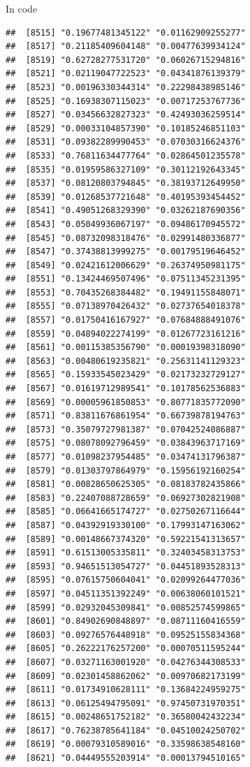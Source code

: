 \documentclass[ignorenonframetext,]{beamer}
\begin{document}
\begin{frame}[fragile]{In code}
\begin{verbatim}
##  [8515] "0.19677481345122" "0.01162909255277"
##  [8517] "0.21185409604148" "0.00477639934124"
##  [8519] "0.62728277531720" "0.06026715294816"
##  [8521] "0.02119047722523" "0.04341876139379"
##  [8523] "0.00196330344314" "0.22298438985146"
##  [8525] "0.16938307115023" "0.00717253767736"
##  [8527] "0.03456632827323" "0.42493036259514"
##  [8529] "0.00033104857390" "0.10185246851103"
##  [8531] "0.09382289990453" "0.07030316624376"
##  [8533] "0.76811634477764" "0.02864501235578"
##  [8535] "0.01959586327109" "0.30112192643345"
##  [8537] "0.08120803794845" "0.38193712649950"
##  [8539] "0.01268537721648" "0.40195393454452"
##  [8541] "0.49051268329390" "0.03262187690356"
##  [8543] "0.05049936067197" "0.09486170945572"
##  [8545] "0.08732098318476" "0.02991480336877"
##  [8547] "0.37438813999275" "0.00179519646452"
##  [8549] "0.02421612006629" "0.26374950981175"
##  [8551] "0.13424469507496" "0.07511345231395"
##  [8553] "0.70435268384482" "0.19491155848071"
##  [8555] "0.07138970426432" "0.02737654018378"
##  [8557] "0.01750416167927" "0.07684888491076"
##  [8559] "0.04894022274199" "0.01267723161216"
##  [8561] "0.00115385356790" "0.00019398318090"
##  [8563] "0.00480619235821" "0.25631141129323"
##  [8565] "0.15933545023429" "0.02173232729127"
##  [8567] "0.01619712989541" "0.10178562536883"
##  [8569] "0.00005961850853" "0.80771835772090"
##  [8571] "0.83811676861954" "0.66739878194763"
##  [8573] "0.35079727981387" "0.07042524086887"
##  [8575] "0.08078092796459" "0.03843963717169"
##  [8577] "0.01098237954485" "0.03474131796387"
##  [8579] "0.01303797864979" "0.15956192160254"
##  [8581] "0.00828650625305" "0.08183782435866"
##  [8583] "0.22407088728659" "0.06927302821908"
##  [8585] "0.06641665174727" "0.02750267116644"
##  [8587] "0.04392919330100" "0.17993147163062"
##  [8589] "0.00148667374320" "0.59221541313657"
##  [8591] "0.61513005335811" "0.32403458313753"
##  [8593] "0.94651513054727" "0.04451893528313"
##  [8595] "0.07615750604041" "0.02099264477036"
##  [8597] "0.04511351392249" "0.00638060101521"
##  [8599] "0.02932045309841" "0.00852574599865"
##  [8601] "0.84902690848897" "0.08711160416559"
##  [8603] "0.09276576448918" "0.09525155834368"
##  [8605] "0.26222176257200" "0.00070511595244"
##  [8607] "0.03271163001920" "0.04276344308533"
##  [8609] "0.02301458862062" "0.00970682173199"
##  [8611] "0.01734910628111" "0.13684224959275"
##  [8613] "0.06125494795091" "0.97450731970351"
##  [8615] "0.00248651752182" "0.36580042432234"
##  [8617] "0.76238785641184" "0.04510024250702"
##  [8619] "0.00079310589016" "0.33598638548160"
##  [8621] "0.04449555203914" "0.00013794510165"

\end{verbatim}
\end{frame}
\end{document}
